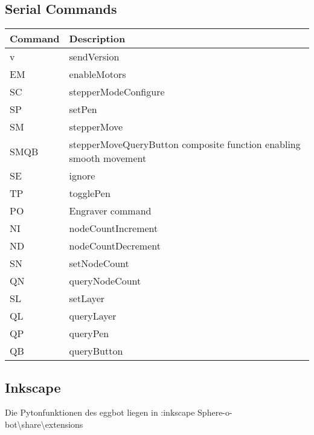 \subsection{Serial Commands}
\begin{minipage}[t]{1.0\textwidth}
\begin{tabular}{|p{}|p{}|}
\hline
\CItoprowcolor \textbf{Command} & \textbf{Description}\\
\hline
v & sendVersion\\
\hline
EM & enableMotors\\
\hline
SC & stepperModeConfigure\\
\hline
SP & setPen\\
\hline
SM & stepperMove\\
\hline
SMQB & stepperMoveQueryButton composite function enabling smooth movement\\
\hline
SE & ignore\\
\hline
TP & togglePen\\
\hline
PO & Engraver command\\
\hline
NI & nodeCountIncrement\\
\hline
ND & nodeCountDecrement\\
\hline
SN & setNodeCount\\
\hline
QN & queryNodeCount\\
\hline
SL & setLayer\\
\hline
QL & queryLayer\\
\hline
QP & queryPen\\
\hline
QB & queryButton\\
\hline
\end{tabular}
\label{tab:Tabelle1}
\end{minipage}

\subsection{Inkscape}
Die Pytonfunktionen des eggbot liegen in :inkscape Sphere-o-bot\textbackslash share\textbackslash extensions\\
 